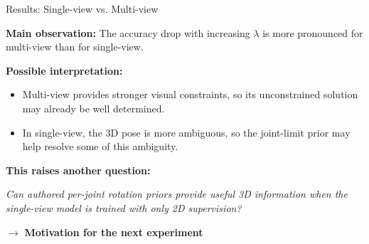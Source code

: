\documentclass[aspectratio=169,11pt]{beamer}
\begin{document}
\begin{frame}{Results: Single-view vs. Multi-view}

\textbf{Main observation:}
The accuracy drop with increasing $\lambda$ is more pronounced for
multi-view than for single-view.

\vspace{0.7em}

\textbf{Possible interpretation:}

\begin{itemize}
    \item Multi-view provides stronger visual constraints, so its
    unconstrained solution may already be well determined.
    \item In single-view, the 3D pose is more ambiguous, so the joint-limit
    prior may help resolve some of this ambiguity.
\end{itemize}

\vspace{0.7em}

\textbf{This raises another question:}

\begin{center}
\itshape
Can authored per-joint rotation priors provide useful 3D information
when the single-view model is trained with only 2D supervision?
\end{center}

\vspace{0.4em}

\centering
$\rightarrow$ \textbf{Motivation for the next experiment}

\end{frame}
\end{document}
